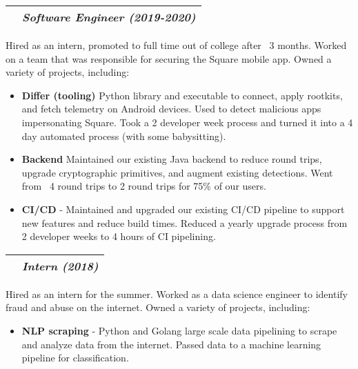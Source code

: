 \documentclass[letterpaper,10pt]{article}
\makeatletter
\newcommand{\sectiontitle}[2]{%
  \begin{tabularx}{\linewidth}{@{} X c @{}}
    {\sffamily\textbf{#1}} & {\rmfamily\textit{#2}} \\ \hline
  \end{tabularx}%
  \vspace{3pt}%
}
\newcommand{\inlineimg}[2][width=0.4cm]{%
  \begin{adjustbox}{raise=-0.2\height}%
    \texttt{[image: \#2]}%
  \end{adjustbox}%
}
\makeatother
\begin{document}
\begin{minipage}[t]{\firstcolwidth}
  \vspace{3pt}
  \sectiontitle{\inlineimg[width=12pt]{assets/square.png} Square Inc. [Mobile Security]}{Software Engineer (2019-2020)}
  Hired as an intern, promoted to full time out of college after ~3 months.
  Worked on a team that was responsible for securing the Square mobile app.
  Owned a variety of projects, including:
  \begin{itemize}[leftmargin=*,label=\faCaretRight,itemsep=2pt,topsep=0pt]
    \item \textbf{Differ (tooling)} Python library and executable to connect, apply rootkits, and fetch telemetry on Android devices. Used to detect malicious apps impersonating Square. Took a 2 developer week process and turned it into a 4 day automated process (with some babysitting).
    \item \textbf{Backend} Maintained our existing Java backend to reduce round trips, upgrade cryptographic primitives, and augment existing detections. Went from ~4 round trips to 2 round trips for 75\% of our users.
    \item \textbf{CI/CD} - Maintained and upgraded our existing CI/CD pipeline to support new features and reduce build times. Reduced a yearly upgrade process from 2 developer weeks to 4 hours of CI pipelining.
  \end{itemize}

  \vspace{3pt}
  \sectiontitle{\inlineimg{assets/cisco.png} Cisco Umbrella [OpenDNS]}{Intern (2018)}
  Hired as an intern for the summer. Worked as a data science engineer to identify fraud and abuse on the internet. Owned a variety of projects, including:
  \begin{itemize}[leftmargin=*,label=\faCaretRight,noitemsep,topsep=0pt]
    \item \textbf{NLP scraping} - Python and Golang large scale data pipelining to scrape and analyze data from the internet. Passed data to a machine learning pipeline for classification.
  \end{itemize}
\end{minipage}\hspace{\columnsep}
%
\end{document}

